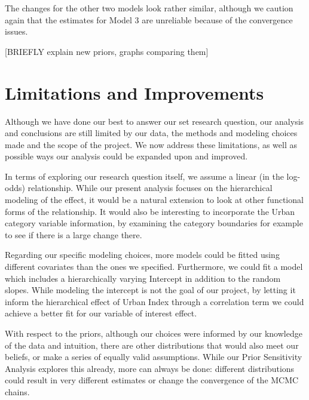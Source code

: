 \documentclass[12pt]{article}
\begin{document}
The changes for the other two models look rather similar, although we caution again that the estimates for Model 3 are unreliable because of the convergence issues.





[BRIEFLY explain new priors, graphs comparing them]



\section{Limitations and Improvements}


Although we have done our best to answer our set research question, our analysis and conclusions are still limited by our data, the methods and modeling choices made and the scope of the project.
We now address these limitations, as well as possible ways our analysis could be expanded upon and improved.


In terms of exploring our research question itself, we assume a linear (in the log-odds) relationship. While our present analysis focuses on the hierarchical modeling of the effect, it would be a natural extension to look at other functional forms of the relationship. It would also be interesting to incorporate the Urban category variable information, by examining the category boundaries for example to see if there is a large change there.

Regarding our specific modeling choices, more models could be fitted using different covariates than the ones we specified. Furthermore, we could fit a model which includes a hierarchically varying Intercept in addition to the random slopes. While modeling the intercept is not the goal of our project, by letting it inform the hierarchical effect of Urban Index through a correlation term we could achieve a better fit for our variable of interest effect.


With respect to the priors, although our choices were informed by our knowledge of the data and intuition, there are other distributions that would also meet our beliefs, or make a series of equally valid assumptions. While our Prior Sensitivity Analysis explores this already, more can always be done: different distributions could result in very different estimates or change the convergence of the MCMC chains. 
\end{document}
